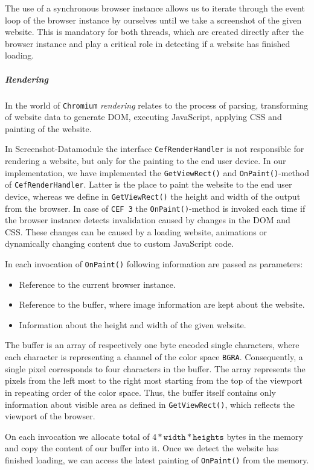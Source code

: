 The use of a synchronous browser instance allows us to iterate through the event loop of the browser instance by ourselves until we take a screenshot of the given website. This is mandatory for both threads, which are created directly after the browser instance and play a critical role in detecting if a website has finished loading. 

\subparagraph*{Rendering}
In the world of \texttt{Chromium} \textit{rendering} relates to the process of parsing, transforming of website data to generate DOM, executing JavaScript, applying CSS and painting of the website. 

In Screenshot-Datamodule the interface \texttt{CefRenderHandler} is not responsible for rendering a website, but only for the painting to the end user device. In our implementation, we have implemented the \texttt{GetViewRect()} and \texttt{OnPaint()}-method of \texttt{CefRenderHandler}. Latter is the place to paint the website to the end user device, whereas we define in \texttt{GetViewRect()} the height and width of the output from the browser. In case of \texttt{CEF 3} the \texttt{OnPaint()}-method is invoked each time if the browser instance detects invalidation caused by changes in the DOM and CSS. These changes can be caused by a loading website, animations or dynamically changing content due to custom JavaScript code.

In each invocation of \texttt{OnPaint()} following information are passed as parameters:

\begin{itemize}
	\item Reference to the current browser instance.
	\item Reference to the buffer, where image information are kept about the website.
	\item Information about the height and width of the given website.
\end{itemize}

The buffer is an array of respectively one byte encoded single characters, where each character is representing a channel of the color space \texttt{BGRA}. Consequently, a single pixel corresponds to four characters in the buffer. The array represents the pixels from the left most to the right most starting from the top of the viewport in repeating order of the color space. Thus, the buffer itself contains only information about visible area as defined in \texttt{GetViewRect()}, which reflects the viewport of the browser.

On each invocation we allocate total of $4 * \texttt{width} * \texttt{heights}$ bytes in the memory and copy the content of our buffer into it. Once we detect the website has finished loading, we can access the latest painting of \texttt{OnPaint()} from the memory.


